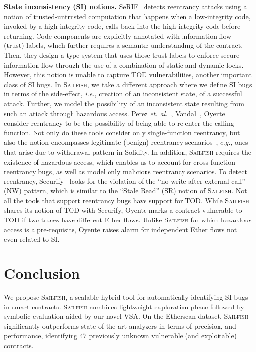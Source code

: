 \documentclass[conference, romanappendices]{tex/IEEEtran}
\theoremstyle{bfnote}
\newcommand{\toolname}{\textsc{Sailfish}\xspace}
\newcommand{\oyente}{{\sc Oyente}\xspace}
\newcommand{\securify}{{\sc Securify}\xspace}
\newcommand{\serif}{{\sc SeRIF}\xspace}
\newcommand{\vandal}{{\sc Vandal}\xspace}
\newcommand{\solidity}{{\sc Solidity}\xspace}
\newcommand{\etherscan}{{\sc Etherscan}\xspace}
\newcommand{\ether}{{Ether}\xspace}
\newcommand{\reentrancy}{{reentrancy}\xspace}
\newcommand{\haz}{{hazardous access}\xspace}
\newcommand{\etal}{\textit{et. al.}}
\newcommand{\eg}{\textit{e.g.}}
\newcommand{\ie}{\textit{i.e.}}
\begin{document}
\noindent
\textbf{State inconsistency (SI) notions.}
\serif~\cite{cecchetti21} detects \reentrancy attacks using a notion of trusted-untrusted computation that happens when a low-integrity code, invoked by a high-integrity code, calls back into the high-integrity code before returning.
Code components are explicitly annotated with information flow (trust) labels, which further requires a semantic understanding of the contract.
Then, they design a type system that uses those trust labels to enforce secure information flow through the use of a combination of static and dynamic locks.
However, this notion is unable to capture TOD vulnerabilities, another important class of 
SI bugs.
In \toolname, we take a different approach where we define SI bugs in terms of the side-effect, \ie, creation of an inconsistent state, of a successful attack.
Further, we model the possibility of an inconsistent state resulting from such an attack through \haz.
Perez \etal~\cite{perez21}, \vandal~\cite{vandal}, \oyente~\cite{oyente} consider \reentrancy to be the possibility of being able to re-enter the calling function.
Not only do these tools consider only single-function \reentrancy, but also the notion encompasses legitimate (benign) \reentrancy scenarios~\cite{sereum}, \eg, ones that arise due to withdrawal pattern in \solidity.
In addition, \toolname requires the existence of \haz, which enables us to account for cross-function \reentrancy bugs, as well as model only malicious \reentrancy scenarios.
To detect \reentrancy, \securify~\cite{securify} looks for the violation of the ``no write after external call'' (NW) pattern, which is similar to the ``Stale Read'' (SR) notion of \toolname.
Not all the tools that support \reentrancy bugs have support for TOD.
While \toolname shares its notion of TOD with \securify, \oyente marks a contract vulnerable to TOD if two traces have different \ether flows.
Unlike \toolname for which \haz is a pre-requisite, \oyente raises alarm for independent \ether flows not even related to SI.
 	\section{Conclusion}
\label{conclusions}
We propose \toolname, a scalable hybrid tool for automatically identifying SI bugs in smart contracts. \toolname combines lightweight exploration phase followed by symbolic evaluation aided by our novel VSA. 
On the \etherscan dataset, \toolname significantly outperforms  state of the art analyzers in terms of precision, and performance, identifying $47$ previously unknown vulnerable (and exploitable) contracts.
\end{document}
